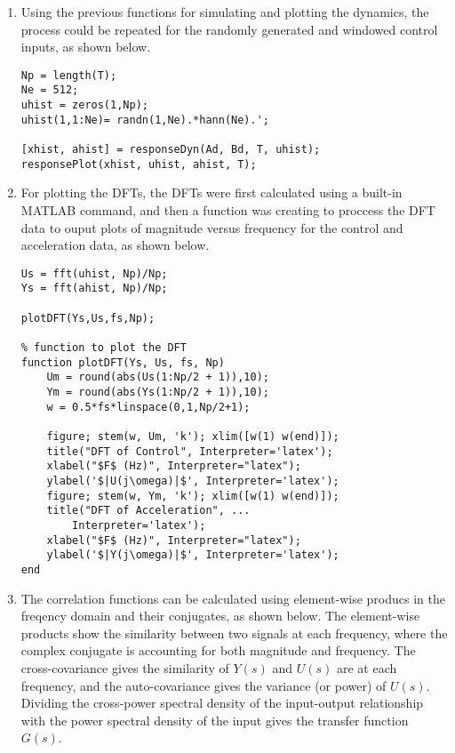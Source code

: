\documentclass{article}
\begin{document}
\begin{enumerate}
\begin{lstlisting}[style=Matlab-editor]
    % plot the acceleration
    figure; stairs(T(1:end - 1), ahist, 'k'); 
    xlim([T0, Tf])
    ylabel("$\ddot{x}$", Interpreter='latex');
    xlabel("$t$ (s)", Interpreter="latex")
    title("Acceleration vs. Time", ...
        Interpreter="latex")
end
    \end{lstlisting}

    \item Using the previous functions for simulating and plotting the dynamics, the process could be repeated for the randomly generated and windowed control inputs, as shown below.

    \begin{lstlisting}[style=Matlab-editor]
Np = length(T);
Ne = 512;
uhist = zeros(1,Np);
uhist(1,1:Ne)= randn(1,Ne).*hann(Ne).';

[xhist, ahist] = responseDyn(Ad, Bd, T, uhist);
responsePlot(xhist, uhist, ahist, T);
    \end{lstlisting}

    \item For plotting the DFTs, the DFTs were first calculated using a built-in MATLAB command, and then a function was creating to proccess the DFT data to ouput plots of magnitude versus frequency for the control and acceleration data, as shown below.

        \begin{lstlisting}[style=Matlab-editor]
Us = fft(uhist, Np)/Np;
Ys = fft(ahist, Np)/Np;

plotDFT(Ys,Us,fs,Np);

% function to plot the DFT
function plotDFT(Ys, Us, fs, Np)
    Um = round(abs(Us(1:Np/2 + 1)),10);
    Ym = round(abs(Ys(1:Np/2 + 1)),10);
    w = 0.5*fs*linspace(0,1,Np/2+1);
    
    figure; stem(w, Um, 'k'); xlim([w(1) w(end)]);
    title("DFT of Control", Interpreter='latex');
    xlabel("$F$ (Hz)", Interpreter="latex");
    ylabel('$|U(j\omega)|$', Interpreter='latex'); 
    figure; stem(w, Ym, 'k'); xlim([w(1) w(end)]);
    title("DFT of Acceleration", ...
        Interpreter='latex');
    xlabel("$F$ (Hz)", Interpreter="latex");
    ylabel('$|Y(j\omega)|$', Interpreter='latex');
end
    \end{lstlisting}

    \item The correlation functions can be calculated using element-wise producs in the freqency domain and their conjugates, as shown below. The element-wise products show the similarity between two signals at each frequency, where the complex conjugate is accounting for both magnitude and frequency. The cross-covariance gives the similarity of $Y(s)$ and $U(s)$ are at each frequency, and the auto-covariance gives the variance (or power) of $U(s)$.  Dividing the cross-power spectral density of the input-output relationship with the power spectral density of the input gives the transfer function $G(s)$.


\end{enumerate}
\end{document}
